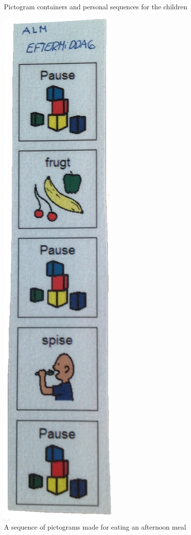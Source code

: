 \begin{figure}
\begin{minipage}{.7\textwidth}
\caption{Pictogram containers and personal sequences for the children}
\label{fig:pictogram_container}
\end{minipage}\hfill
\begin{minipage}{.3\textwidth}
\centering
\includegraphics[scale=0.17]{Pics/Sprint1/pictogram_sequence.jpg}
\caption{A sequence of pictograms made for eating an afternoon meal}
\label{fig:sequence}
\end{minipage}
\end{figure}

